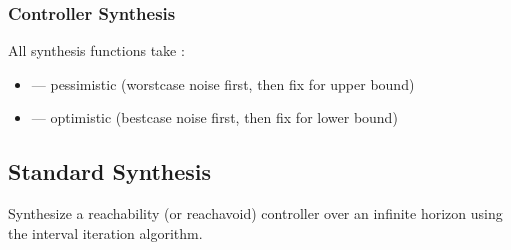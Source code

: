 \documentclass[a4paper,10pt,english]{sphinxmanual}
\begin{document}
\begin{fulllineitems}
\subsubsection{Controller Synthesis}
\label{\detokenize{api/imdp:controller-synthesis}}
\sphinxAtStartPar
All synthesis functions take :
\begin{itemize}
\item {} 
\sphinxAtStartPar
{} — pessimistic (worst\sphinxhyphen{}case noise first, then fix for upper bound)

\item {} 
\sphinxAtStartPar
{} — optimistic (best\sphinxhyphen{}case noise first, then fix for lower bound)

\end{itemize}


\subsection{Standard Synthesis}
\label{\detokenize{api/imdp:standard-synthesis}}

\begin{fulllineitems}
\label{\detokenize{api/imdp:_CPPv4N4IMDP30infiniteHorizonReachControllerEb}}\label{\detokenize{api/imdp:_CPPv3N4IMDP30infiniteHorizonReachControllerEb}}\label{\detokenize{api/imdp:_CPPv2N4IMDP30infiniteHorizonReachControllerEb}}\label{\detokenize{api/imdp:IMDP::infiniteHorizonReachController__b}}
\pysigstartsignatures
\pysigstartmultiline
\pysiglinewithargsret
{}
{}
{}
\pysigstopmultiline
\pysigstopsignatures
\sphinxAtStartPar
Synthesize a reachability (or reach\sphinxhyphen{}avoid) controller over an infinite horizon
using the interval iteration algorithm.

\end{fulllineitems}



\end{fulllineitems}
\end{document}
